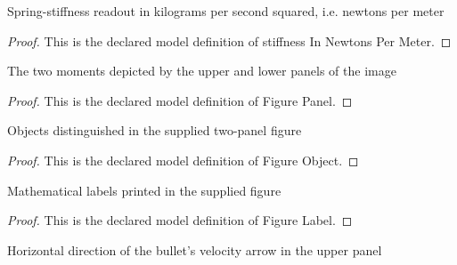 \begin{definition}
  \label{def:physics:phyx-mini-0202:phyxminiproblems-problemphyxmini0202-stiffnessinnewtonspermeter}
  Spring-stiffness readout in kilograms per second squared, i.e. newtons per meter
\end{definition}
\begin{proof}
  This is the declared model definition of stiffness In Newtons Per Meter.
\end{proof}
\begin{definition}
  \label{def:physics:phyx-mini-0202:phyxminiproblems-problemphyxmini0202-figurepanel}
  The two moments depicted by the upper and lower panels of the image
\end{definition}
\begin{proof}
  This is the declared model definition of Figure Panel.
\end{proof}
\begin{definition}
  \label{def:physics:phyx-mini-0202:phyxminiproblems-problemphyxmini0202-figureobject}
  Objects distinguished in the supplied two-panel figure
\end{definition}
\begin{proof}
  This is the declared model definition of Figure Object.
\end{proof}
\begin{definition}
  \label{def:physics:phyx-mini-0202:phyxminiproblems-problemphyxmini0202-figurelabel}
  Mathematical labels printed in the supplied figure
\end{definition}
\begin{proof}
  This is the declared model definition of Figure Label.
\end{proof}
\begin{definition}
  \label{def:physics:phyx-mini-0202:phyxminiproblems-problemphyxmini0202-horizontaldirection}
  Horizontal direction of the bullet's velocity arrow in the upper panel
\end{definition}
